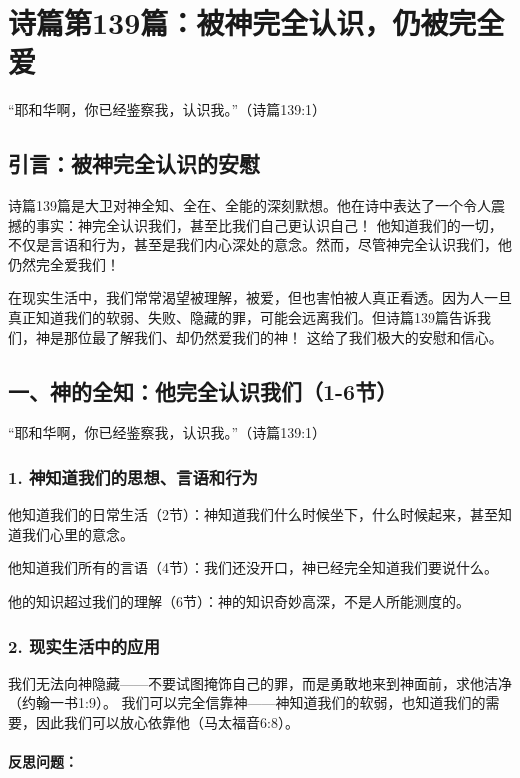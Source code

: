 \documentclass[a4paper, 12pt]{article}
\begin{document}
\section{诗篇第139篇：被神完全认识，仍被完全爱}


“耶和华啊，你已经鉴察我，认识我。”（诗篇139:1）

\subsection*{引言：被神完全认识的安慰}
\hspace{0.6cm}诗篇139篇是大卫对神全知、全在、全能的深刻默想。他在诗中表达了一个令人震撼的事实：神完全认识我们，甚至比我们自己更认识自己！ 他知道我们的一切，不仅是言语和行为，甚至是我们内心深处的意念。然而，尽管神完全认识我们，他仍然完全爱我们！

在现实生活中，我们常常渴望被理解，被爱，但也害怕被人真正看透。因为人一旦真正知道我们的软弱、失败、隐藏的罪，可能会远离我们。但诗篇139篇告诉我们，神是那位最了解我们、却仍然爱我们的神！ 这给了我们极大的安慰和信心。

\subsection*{一、神的全知：他完全认识我们（1-6节）}
“耶和华啊，你已经鉴察我，认识我。”（诗篇139:1）

\subsubsection*{1. 神知道我们的思想、言语和行为}
\hspace{0.6cm}他知道我们的日常生活（2节）：神知道我们什么时候坐下，什么时候起来，甚至知道我们心里的意念。

他知道我们所有的言语（4节）：我们还没开口，神已经完全知道我们要说什么。

他的知识超过我们的理解（6节）：神的知识奇妙高深，不是人所能测度的。
\subsubsection*{2. 现实生活中的应用}
我们无法向神隐藏——不要试图掩饰自己的罪，而是勇敢地来到神面前，求他洁净（约翰一书1:9）。
我们可以完全信靠神——神知道我们的软弱，也知道我们的需要，因此我们可以放心依靠他（马太福音6:8）。
\paragraph*{反思问题：}
\end{document}
